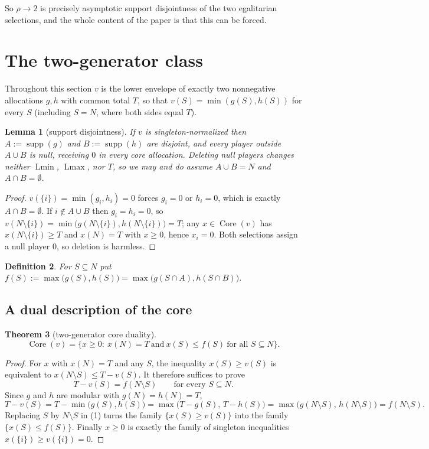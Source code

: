 \documentclass[11pt]{article}
\newtheorem{theorem}{Theorem}
\newtheorem{lemma}[theorem]{Lemma}
\newtheorem{definition}[theorem]{Definition}
\newcommand{\core}{\operatorname{Core}}
\newcommand{\Lmin}{\operatorname{Lmin}}
\newcommand{\Lmax}{\operatorname{Lmax}}
\newcommand{\supp}{\operatorname{supp}}
\begin{document}
So $\rho\to2$ is precisely asymptotic support disjointness of the two
egalitarian selections, and the whole content of the paper is that this can
be forced.

\section{The two-generator class}\label{sec:twogen}

Throughout this section $v$ is the lower envelope of exactly two nonnegative
allocations $g,h$ with common total $T$, so that $v(S)=\min(g(S),h(S))$ for
every $S$ (including $S=N$, where both sides equal $T$).

\begin{lemma}[support disjointness]\label{lem:disjoint}
If $v$ is singleton-normalized then $A:=\supp(g)$ and $B:=\supp(h)$ are
disjoint, and every player outside $A\cup B$ is null, receiving $0$ in every
core allocation.  Deleting null players changes neither $\Lmin$, $\Lmax$, nor
$T$, so we may and do assume $A\cup B=N$ and $A\cap B=\emptyset$.
\end{lemma}

\begin{proof}
$v(\{i\})=\min(g_i,h_i)=0$ forces $g_i=0$ or $h_i=0$, which is exactly
$A\cap B=\emptyset$.  If $i\notin A\cup B$ then $g_i=h_i=0$, so
$v(N\setminus\{i\})=\min\bigl(g(N\setminus\{i\}),h(N\setminus\{i\})\bigr)=T$;
any $x\in\core(v)$ has $x(N\setminus\{i\})\ge T$ and $x(N)=T$ with $x\ge0$,
hence $x_i=0$.  Both selections assign a null player $0$, so deletion is
harmless.
\end{proof}

\begin{definition}
For $S\subseteq N$ put $f(S):=\max\bigl(g(S),h(S)\bigr)=\max\bigl(g(S\cap A),h(S\cap B)\bigr)$.
\end{definition}

\subsection{A dual description of the core}

\begin{theorem}[two-generator core duality]\label{thm:duality}
\[
 \core(v)=\bigl\{x\ge0:\ x(N)=T\ \text{and}\ x(S)\le f(S)\ \text{for all }S\subseteq N\bigr\}.
\]
\end{theorem}

\begin{proof}
For $x$ with $x(N)=T$ and any $S$, the inequality $x(S)\ge v(S)$ is
equivalent to $x(N\setminus S)\le T-v(S)$.  It therefore suffices to prove
\[
 T-v(S)=f(N\setminus S)\qquad\text{for every }S\subseteq N.  \tag{1}
\]
Since $g$ and $h$ are modular with $g(N)=h(N)=T$,
\[
 T-v(S)=T-\min\bigl(g(S),h(S)\bigr)
 =\max\bigl(T-g(S),\,T-h(S)\bigr)
 =\max\bigl(g(N\setminus S),\,h(N\setminus S)\bigr)
 =f(N\setminus S).
\]
Replacing $S$ by $N\setminus S$ in (1) turns the family
$\{x(S)\ge v(S)\}$ into the family $\{x(S)\le f(S)\}$.  Finally $x\ge0$ is
exactly the family of singleton inequalities $x(\{i\})\ge v(\{i\})=0$.
\end{proof}
\end{document}
